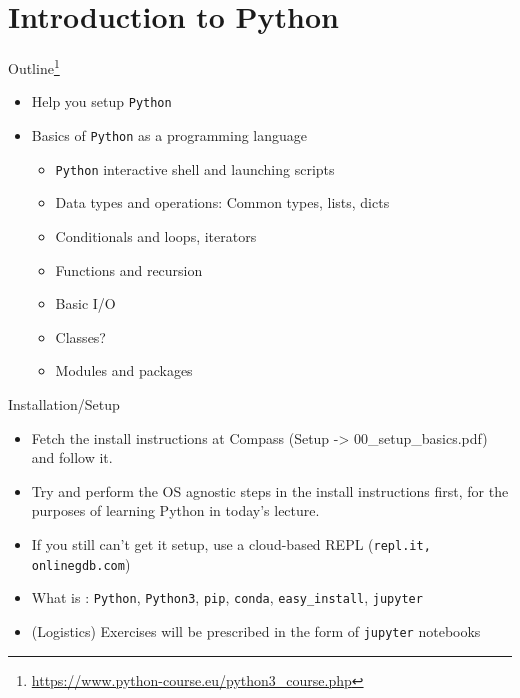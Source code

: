 \documentclass[presentation]{beamer}
\begin{document}
\section{Introduction to Python}
\label{sec:orgee1b2e9}
\begin{frame}[label={sec:org811eb29},fragile]{Outline\footnote{\url{https://www.python-course.eu/python3\_course.php}}}
 \begin{itemize}
\item Help you setup \texttt{Python}
\item Basics of \texttt{Python} as a programming language
\begin{itemize}
\item \texttt{Python} interactive shell and launching scripts
\item Data types and operations: Common types, lists, dicts
\item Conditionals and loops, iterators
\item Functions and recursion
\item Basic I/O
\item Classes?
\item Modules and packages
\end{itemize}
\end{itemize}
\end{frame}

\begin{frame}[label={sec:orgf2295d6},fragile]{Installation/Setup}
 \begin{itemize}
\item Fetch the install instructions at Compass (Setup -> 00\_setup\_basics.pdf) and follow it.
\item Try and perform the OS agnostic steps in the install instructions first,
for the purposes of learning Python in today's lecture.
\item If you still can't get it setup, use a cloud-based REPL (\texttt{repl.it, onlinegdb.com})
\item What is : \texttt{Python}, \texttt{Python3}, \texttt{pip}, \texttt{conda}, \texttt{easy\_install}, \texttt{jupyter}
\item (Logistics) Exercises will be prescribed in the form of \texttt{jupyter} notebooks
\end{itemize}
\end{frame}
\end{document}
